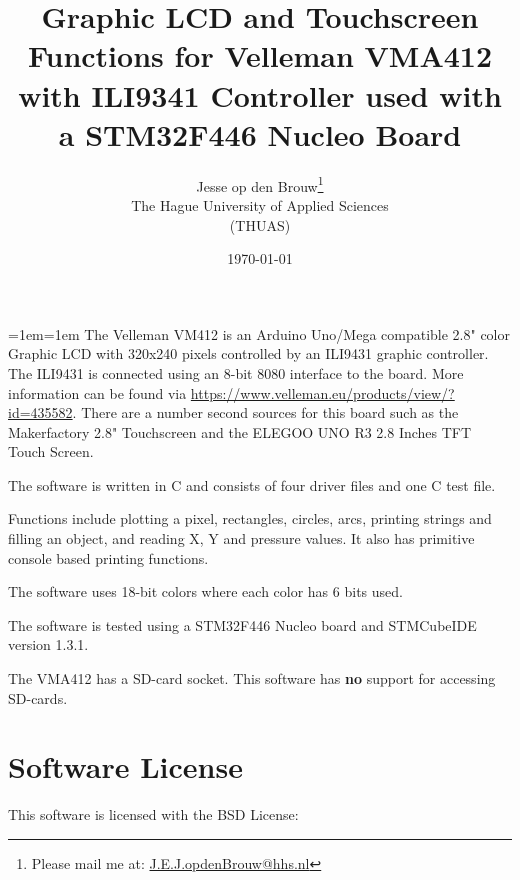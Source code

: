\documentclass[12pt]{article}
\author{Jesse op den Brouw\thanks{Please mail me at: \href{mailto:J.E.J.opdenBrouw@hhs.nl}{J.E.J.opdenBrouw@hhs.nl}}\\The Hague University of Applied Sciences\\(THUAS)}
\title{Graphic LCD and Touchscreen Functions for Velleman VMA412 with ILI9341 Controller used with a STM32F446 Nucleo Board}
\date{\today}
\begin{document}
\raggedbottom
\maketitle

\vfill
{\small\leftskip=1em\rightskip=1em
The Velleman VM412 is an Arduino Uno/Mega compatible 2.8" color Graphic LCD with 320x240 pixels controlled by an ILI9431 graphic controller. The ILI9431 is connected using an 8-bit 8080 interface to the board. More information can be found via \url{https://www.velleman.eu/products/view/?id=435582}. There are a number second sources for this board such as the Makerfactory 2.8" Touchscreen and the ELEGOO UNO R3 2.8 Inches TFT Touch Screen.

The software is written in C and consists of four driver files and one C test file.

Functions include plotting a pixel, rectangles, circles, arcs, printing strings and filling an object, and reading X, Y and pressure values. It also has primitive console based printing functions.

The software uses 18-bit colors where each color has 6 bits used.

The software is tested using a STM32F446 Nucleo board and STMCubeIDE version 1.3.1.

The VMA412 has a SD-card socket. This software has \textbf{no} support for accessing SD-cards.

}
\vfill

\newpage
\tableofcontents


\newpage

\section{Software License}
This software is licensed with the BSD License:
\end{document}
